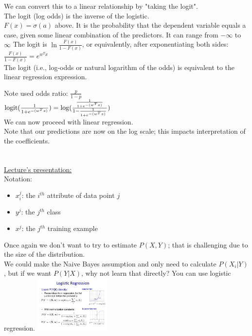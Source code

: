 We can convert this to a linear relationship by "taking the logit". \hfill \\
The logit (log odds) is the inverse of the logistic.  \hfill \\ %
$F(x) = \sigma(a)$ above.  It is the probability that the dependent variable equals a case, given some linear combination of the predictors.  It can range from $- \infty$ to $\infty$   %
The logit is $\ln \frac{F(x)}{1-F(x)}$, or equivalently, after exponentiating both sides: \hfill \\
$\frac{F(x)}{1-F(x)} = e^{w^Tx}$  \hfill \\
The logit (i.e., log-odds or natural logarithm of the odds) is equivalent to the linear regression expression.

 


Note used odds ratio: $\frac{p}{1-p}$  \hfill \\
$\textrm{logit}(\frac{1}{1+ e^{-(w^Tx)}}) = \log(\frac{\frac{1}{1+ e^{-(w^Tx)}}}{1-\frac{1}{1+ e^{-(w^Tx)}}}) $  \hfill \\ %
We can now proceed with linear regression.  \hfill \\
Note that our predictions are now on the log scale; this impacts interpretation of the coefficients.  \hfill \\  %

\hfill \\ \hfill \\   

\underline{Lecture's presentation:} \hfill \\

Notation:  \hfill \\
\begin{itemize}
	\item $x_i^j$: the $i^{th}$ attribute of data point $j$
	\item $y^j$: the $j^{th}$ class  %
	\item $x^j$: the $j^{th}$ training example
\end{itemize}

Once again we don't want to try to estimate $P(X,Y)$; that is challenging due to the size of the distribution. \hfill \\
We could make the Naive Bayes assumption and only need to calculate $P(X_i | Y)$, 
but if we want $P(Y|X)$, why not learn that directly?  You can use logistic regression. 
\includegraphics[width=1.5in]{figures/expo.pdf}     \hfill \\
\hfill \\

